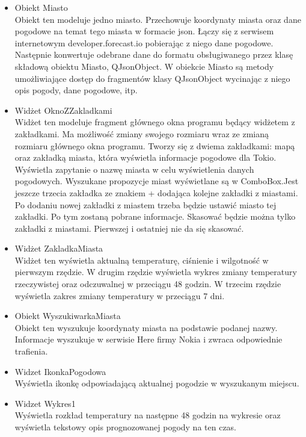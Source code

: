 \documentclass[a4paper]{article}
\begin{document}
\begin{enumerate}
\begin{itemize}
\item Obiekt Miasto\\
Obiekt ten modeluje jedno miasto. Przechowuje koordynaty miasta oraz dane pogodowe na temat tego miasta w formacie json. Łączy się z serwisem internetowym developer.forecast.io pobierając z niego dane pogodowe. Następnie konwertuje odebrane dane do formatu obsługiwanego przez klasę składową obiektu Miasto, QJsonObject.
W obiekcie Miasto są metody umożliwiające dostęp do fragmentów klasy QJsonObject wycinając z niego opis pogody, dane pogodowe, itp.

\item Widżet OknoZZakladkami\\
Widżet ten modeluje fragment głównego okna programu będący widżetem z zakładkami. Ma możliwość zmiany swojego rozmiaru wraz ze zmianą rozmiaru głównego okna programu. Tworzy się z dwiema zakładkami: mapą oraz zakładką miasta, która wyświetla informacje pogodowe dla Tokio. Wyświetla zapytanie o nazwę miasta w celu wyświetlenia danych pogodowych. Wyszukane propozycje miast wyświetlane są w ComboBox.Jest jeszcze trzecia zakładka ze znakiem + dodająca kolejne zakładki z miastami. Po dodaniu nowej zakładki z miastem trzeba będzie ustawić miasto tej zakładki. Po tym zostaną pobrane informacje. Skasować będzie można tylko zakładki z miastami. Pierwszej i ostatniej nie da się skasować.

\item Widżet ZakladkaMiasta\\
Widżet ten wyświetla aktualną temperaturę, ciśnienie i wilgotność w pierwszym rzędzie. W drugim rzędzie wyświetla wykres zmiany temperatury rzeczywistej oraz odczuwalnej w przeciągu 48 godzin. W trzecim rzędzie wyświetla zakres zmiany temperatury w przeciągu 7 dni.

\item Obiekt WyszukiwarkaMiasta\\
Obiekt ten wyszukuje koordynaty miasta na podstawie podanej nazwy. Informacje wyszukuje w serwisie Here firmy Nokia i zwraca odpowiednie trafienia.

\item Widzet IkonkaPogodowa\\
Wyświetla ikonkę odpowiadającą aktualnej pogodzie w wyszukanym miejscu.

\item Widzet Wykres1\\
Wyświetla rozkład temperatury na następne 48 godzin na wykresie oraz wyświetla tekstowy opis prognozowanej pogody na ten czas.


\end{itemize}
\end{enumerate}
\end{document}
